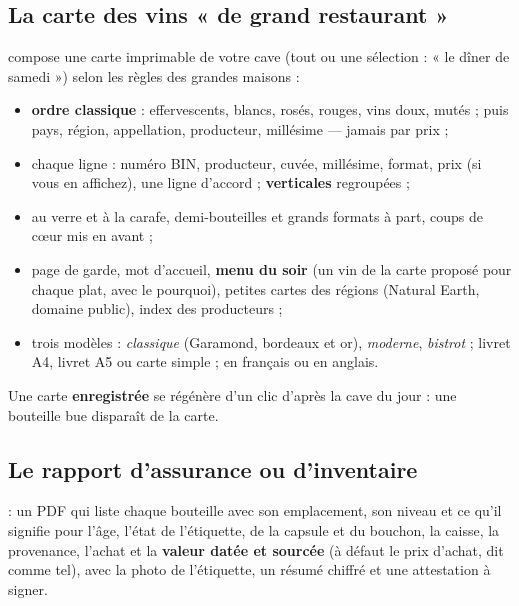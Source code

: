 \documentclass[11pt,a4paper]{article}
\begin{document}
\subsection{La carte des vins « de grand restaurant »}
 compose une carte imprimable de votre cave (tout ou une sélection : « le
dîner de samedi ») selon les règles des grandes maisons :
\begin{itemize}
  \item \textbf{ordre classique} : effervescents, blancs, rosés, rouges, vins doux, mutés ; puis pays,
        région, appellation, producteur, millésime — jamais par prix ;
  \item chaque ligne : numéro BIN, producteur, cuvée, millésime, format, prix (si vous en affichez), une
        ligne d'accord ; \textbf{verticales} regroupées ;
  \item au verre et à la carafe, demi-bouteilles et grands formats à part, coups de cœur mis en avant ;
  \item page de garde, mot d'accueil, \textbf{menu du soir} (un vin de la carte proposé pour chaque plat,
        avec le pourquoi), petites cartes des régions (Natural Earth, domaine public), index des producteurs ;
  \item trois modèles : \emph{classique} (Garamond, bordeaux et or), \emph{moderne}, \emph{bistrot} ; livret
        A4, livret A5 ou carte simple ; en français ou en anglais.
\end{itemize}
Une carte \textbf{enregistrée} se régénère d'un clic d'après la cave du jour : une bouteille bue disparaît
de la carte.


\subsection{Le rapport d'assurance ou d'inventaire}
 : un PDF qui liste chaque bouteille avec son
emplacement, son niveau et ce qu'il signifie pour l'âge, l'état de l'étiquette, de la capsule et du bouchon,
la caisse, la provenance, l'achat et la \textbf{valeur datée et sourcée} (à défaut le prix d'achat, dit
comme tel), avec la photo de l'étiquette, un résumé chiffré et une attestation à signer.
\end{document}

